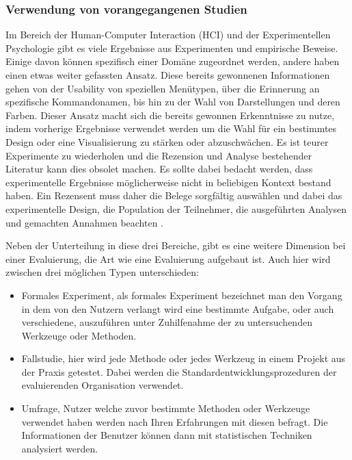 \documentclass[draft=false
              ,paper=a4
              ,twoside=false
              ,fontsize=11pt
              ,headsepline
              ,BCOR10mm
              ,DIV11
              ]{scrbook}
\newcommand{\TODO}[1]{\colorbox{yellow}{\textcolor{red}{[TODO: #1]}}}
\begin{document}
\subsubsection{Verwendung von vorangegangenen Studien} %
\label{ssub:verwendung_von_vorangegangenen_studien}
Im Bereich der Human-Computer Interaction (HCI) und der Experimentellen Psychologie gibt es viele Ergebnisse aus Experimenten und empirische Beweise. Einige davon können spezifisch einer Domäne zugeordnet werden, andere haben einen etwas weiter gefassten Ansatz. Diese bereits gewonnenen Informationen gehen von der Usability von speziellen Menütypen, über die Erinnerung an spezifische Kommandonamen, bis hin zu der Wahl von Darstellungen und deren Farben.
Dieser Ansatz macht sich die bereits gewonnen Erkenntnisse zu nutze, indem vorherige Ergebnisse verwendet werden um die Wahl für ein bestimmtes Design oder eine Visualisierung zu stärken oder abzuschwächen. Es ist teurer Experimente zu wiederholen und die Rezension und Analyse bestehender Literatur kann dies obsolet machen. Es sollte dabei bedacht werden, dass experimentelle Ergebnisse möglicherweise nicht in beliebigen Kontext bestand haben. Ein Rezensent muss daher die Belege sorgfältig auswählen und dabei das experimentelle Design, die Population der Teilnehmer, die ausgeführten Analysen und gemachten Annahmen beachten \cite{alan_dix_human-computer_2004}. 

\iffalse%
Neben der Unterteilung in diese drei Bereiche, gibt es eine weitere Dimension bei einer Evaluierung, die Art wie eine Evaluierung aufgebaut ist. Auch hier wird zwischen drei möglichen Typen unterschieden:

\begin{itemize}
  \item Formales Experiment, als formales Experiment bezeichnet man den Vorgang in dem von den Nutzern verlangt wird eine bestimmte Aufgabe, oder auch verschiedene, auszuführen unter Zuhilfenahme der zu untersuchenden Werkzeuge oder Methoden. 
  \item Fallstudie, hier wird jede Methode oder jedes Werkzeug in einem Projekt aus der Praxis getestet. Dabei werden die Standardentwicklungsprozeduren der evaluierenden Organisation verwendet.
  \item Umfrage, Nutzer welche zuvor bestimmte Methoden oder Werkzeuge verwendet haben werden nach Ihren Erfahrungen mit diesen befragt. Die Informationen der Benutzer können dann mit statistischen Techniken analysiert werden. 

\end{itemize}
\end{document}
